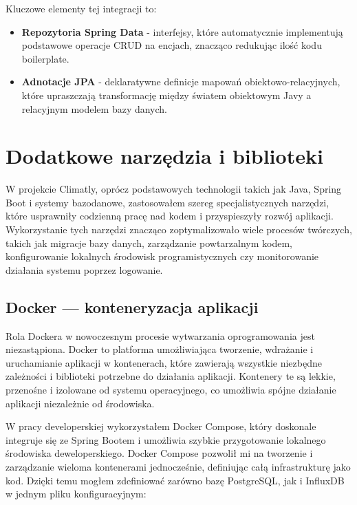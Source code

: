 \documentclass[a4paper,12pt,openany]{book}
\begin{document}
Kluczowe elementy tej integracji to:
\begin{itemize}[noitemsep,topsep=2pt]
\item \textbf{Repozytoria Spring Data} - interfejsy, które automatycznie implementują podstawowe operacje CRUD na encjach, znacząco redukując ilość kodu boilerplate.
\item \textbf{Adnotacje JPA} - deklaratywne definicje mapowań obiektowo-relacyjnych, które upraszczają transformację między światem obiektowym Javy a relacyjnym modelem bazy danych.
\end{itemize}


\section{Dodatkowe narzędzia i biblioteki}

W projekcie Climatly, oprócz podstawowych technologii takich jak Java, Spring Boot i systemy bazodanowe, zastosowałem szereg specjalistycznych narzędzi, które usprawniły codzienną pracę nad kodem i przyspieszyły rozwój aplikacji. Wykorzystanie tych narzędzi znacząco zoptymalizowało wiele procesów twórczych, takich jak migracje bazy danych, zarządzanie powtarzalnym kodem, konfigurowanie lokalnych środowisk programistycznych czy monitorowanie działania systemu poprzez logowanie.

\subsection*{Docker --- konteneryzacja aplikacji}

Rola Dockera w nowoczesnym procesie wytwarzania oprogramowania jest niezastąpiona. Docker to platforma umożliwiająca tworzenie, wdrażanie i uruchamianie aplikacji w kontenerach, które zawierają wszystkie niezbędne zależności i biblioteki potrzebne do działania aplikacji. Kontenery te są lekkie, przenośne i izolowane od systemu operacyjnego, co umożliwia spójne działanie aplikacji niezależnie od środowiska.

W pracy developerskiej wykorzystałem Docker Compose, który doskonale integruje się ze Spring Bootem i umożliwia szybkie przygotowanie lokalnego środowiska deweloperskiego. Docker Compose pozwolił mi na tworzenie i zarządzanie wieloma kontenerami jednocześnie, definiując całą infrastrukturę jako kod. Dzięki temu mogłem zdefiniować zarówno bazę PostgreSQL, jak i InfluxDB w jednym pliku konfiguracyjnym:
\end{document}
